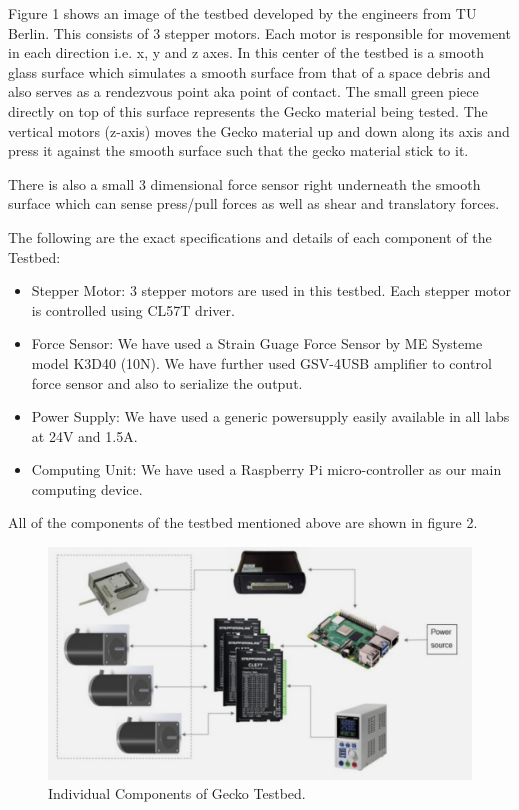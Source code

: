 \documentclass[
    twocolumn,
    fontsize = 10pt,
    parskip = half+,
    headings = small,
    headwidth = text,
    footwidth = text,
]{scrartcl}
\begin{document}
Figure 1 shows an image of the testbed developed by the engineers from TU Berlin. This consists of 3 stepper motors. Each motor is responsible for movement in each direction i.e. x, y and z axes. In this center of the testbed is a smooth glass surface which simulates a smooth surface from that of a space debris and also serves as a rendezvous point aka point of contact. The small green piece directly on top of this surface represents the Gecko material being tested. The vertical motors (z-axis) moves the Gecko material up and down along its axis and press it against the smooth surface such that the gecko material stick to it.

There is also a small 3 dimensional force sensor right underneath the smooth surface which can sense press/pull forces as well as shear and translatory forces. 

The following are the exact specifications and details of each component of the Testbed:

\begin{itemize}
    \item Stepper Motor: 3 stepper motors are used in this testbed. Each stepper motor is controlled using CL57T driver.
    \item Force Sensor: We have used a Strain Guage Force Sensor by ME Systeme model K3D40 (10N). We have further used GSV-4USB amplifier to control force sensor and also to serialize the output.
    \item Power Supply: We have used a generic powersupply easily available in all labs at 24V and 1.5A.
    \item Computing Unit: We have used a Raspberry Pi micro-controller as our main computing device.
\end{itemize}

All of the components of the testbed mentioned above are shown in figure 2.

\begin{figure}[h]
    \centering
    \includegraphics[width=1.0\linewidth]{pics/gecko_testbed_components.png}
    \caption{Individual Components of Gecko Testbed.}
    \label{fig: gecko testbed components}
\end{figure}
\end{document}
